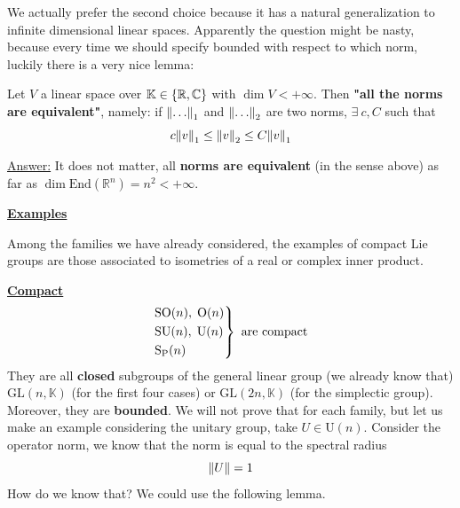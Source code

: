 \documentclass[../main.tex]{subfiles}
\begin{document}
We actually prefer the second choice because it has a natural generalization to infinite dimensional linear spaces. Apparently the question might be nasty, because every time we should specify bounded with respect to which norm, luckily there is a very nice lemma:
\begin{lemma}
Let $V$ a linear space over $\mathbb{K}\in\Bqty{\mathbb{R},\mathbb{C}}$ with $\dim V<+\infty$. Then \textbf{"all the norms are equivalent"}, namely: if $\norm{\dots}_1$ and $\norm{\dots}_2$ are two norms, $\exists \ c,C$ such that
\[
c\norm{v}_1\leq\norm{v}_2\leq C\norm{v}_1
\]
\end{lemma}
\underline{Answer:} It does not matter, all \textbf{norms are equivalent} (in the sense above) as far as $\dim \text{End}(\mathbb{R}^n)=n^2<+\infty$.

\underline{\textbf{Examples}}

Among the families we have already considered, the examples of compact Lie groups are those associated to isometries of a real or complex inner product.

\underline{\textbf{Compact}}
\[
\begin{rcases}
\textrm{SO}(n),\; \textrm{O}(n)\\
\textrm{SU}(n),\; \textrm{U}(n)\\
\text{S}_\text{P}(n)
\end{rcases}
\textrm{ are compact}
\]
They are all \textbf{closed} subgroups of the general linear group (we already know that) $\textrm{GL}(n,\mathbb{K})$ (for the first four cases) or $\textrm{GL}(2n, \mathbb{K})$ (for the simplectic group). Moreover, they are \textbf{bounded}. 
We will not prove that for each family, but let us make an example considering the unitary group, take $U\in \textrm{U}(n)$. Consider the operator norm, we know that the norm is equal to the spectral radius
\[
\norm{U}=1
\]
How do we know that? We could use the following lemma.
\end{document}
